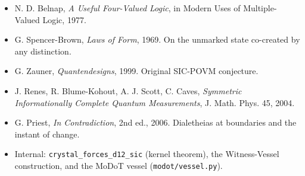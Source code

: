 \documentclass[12pt,a4paper]{article}
\begin{document}
\begin{itemize}
\tightlist
\item
  N. D. Belnap, \emph{A Useful Four-Valued Logic}, in Modern Uses of
  Multiple-Valued Logic, 1977.
\item
  G. Spencer-Brown, \emph{Laws of Form}, 1969. On the unmarked state
  co-created by any distinction.
\item
  G. Zauner, \emph{Quantendesigns}, 1999. Original SIC-POVM conjecture.
\item
  J. Renes, R. Blume-Kohout, A. J. Scott, C. Caves, \emph{Symmetric
  Informationally Complete Quantum Measurements}, J. Math. Phys. 45,
  2004.
\item
  G. Priest, \emph{In Contradiction}, 2nd ed., 2006. Dialetheias at
  boundaries and the instant of change.
\item
  Internal: \texttt{crystal\_forces\_d12\_sic} (kernel theorem), the
  Witness-Vessel construction, and the MoDoT vessel
  (\texttt{modot/vessel.py}).
\end{itemize}
\end{document}
